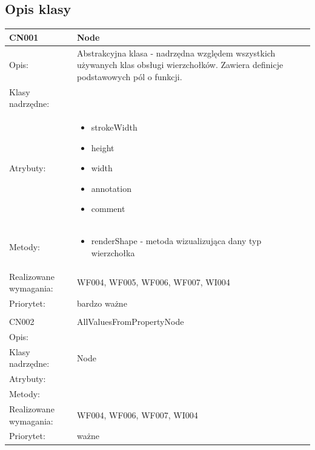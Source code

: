 \documentclass[a4paper,10pt]{article}
\begin{document}
\subsection{Opis klasy}

\begin{center}
 


\begin{longtable}{|m{3cm}|m{9cm}|} \hline

CN001 & Node \\ \hline
Opis: & Abstrakcyjna klasa - nadrzędna względem wszystkich używanych klas obsługi wierzchołków. Zawiera definicje podstawowych pól o funkcji.    \\ \hline
Klasy nadrzędne: &     \\ \hline
Atrybuty: & \begin{itemize}
 \item strokeWidth
 \item height
 \item width
 \item annotation
 \item comment 
\end{itemize}
 \\ \hline
Metody: & \begin{itemize}
 \item renderShape - metoda wizualizująca dany typ wierzchołka
\end{itemize}
  \\ \hline
Realizowane wymagania: & WF004, WF005, WF006, WF007, WI004 \\ \hline
Priorytet: & bardzo ważne  \\ \hline

\multicolumn{2}{c}{} \\
 \hline

CN002 & AllValuesFromPropertyNode \\ \hline
Opis: &     \\ \hline
Klasy nadrzędne: & Node     \\ \hline
Atrybuty: & 
 \\ \hline
Metody: & %
  \\ \hline
Realizowane wymagania: & WF004, WF006, WF007, WI004 \\ \hline
Priorytet: & ważne \\ \hline


\end{longtable}
\end{center}
\end{document}
